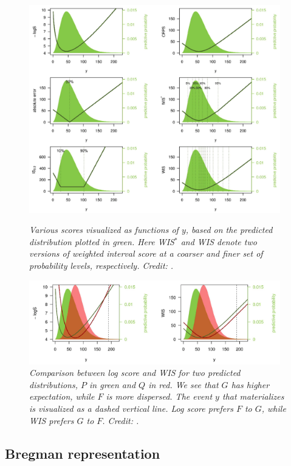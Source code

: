 \documentclass{article}
\begin{document}
\begin{figure}[p]
\centering
\includegraphics[width=0.975\textwidth]{scores1.png}
\caption{\it Various scores visualized as functions of $y$, based on the
  predicted distribution plotted in green. Here WIS$^*$ and WIS denote two
  versions of weighted interval score at a coarser and finer set of probability
  levels, respectively. Credit: \citet{bracher2021evaluating}.}       
\label{fig:scores1}   

\bigskip\medskip

\includegraphics[width=0.975\textwidth]{scores2.png}
\caption{\it Comparison between log score and WIS for two predicted
  distributions, $P$ in green and $Q$ in red. We see that $G$ has higher
  expectation, while $F$ is more dispersed. The event $y$ that materializes is
  visualized as a dashed vertical line. Log score prefers $F$ to $G$, while WIS
  prefers $G$ to $F$. Credit: \citet{bracher2021evaluating}.}          
\label{fig:scores2}
\end{figure}

\subsection{Bregman representation}
\label{sec:bregman_rep}
\end{document}
